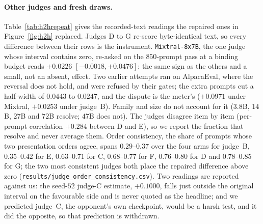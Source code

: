 \paragraph{Other judges and fresh draws.}\label{app:h2hrepeat}
Table~\ref{tab:h2hrepeat} gives the recorded-text readings the repaired ones in Figure~\ref{fig:h2h}
replaced. Judges D to G re-score byte-identical text, so every difference between their rows is the
instrument. \texttt{Mixtral-8x7B}, the one judge whose interval contains zero, re-asked on the $850$-prompt
pass at a binding budget reads $+0.0226$ $[-0.0018, +0.0476]$: the same sign as the others and a small, not an absent, effect. Two earlier attempts ran on AlpacaEval, where the reversal does not hold, and were refused by their gates; the extra prompts cut a half-width of $0.0443$ to $0.0247$, and the dispute is the meter's ($+0.0971$ under Mixtral, $+0.0253$ under judge~B). Family and size do not account for it ($3.8$B, $14$B, $27$B and $72$B resolve;
$47$B does not). The judges disagree item by item (per-prompt correlation $+0.284$ between D and E), so we
report the fraction that resolve and never average them. Order consistency, the share of prompts whose
two presentation orders agree, spans $0.29$--$0.37$ over the four arms for judge~B, $0.35$--$0.42$ for E,
$0.63$--$0.71$ for C, $0.68$--$0.77$ for F, $0.76$--$0.80$ for D and $0.78$--$0.85$ for G; the two most
consistent judges both place the repaired difference above zero
(\texttt{results/\allowbreak judge\_\allowbreak order\_\allowbreak consistency.csv}). Two readings are reported against us: the
seed-$52$ judge-C estimate, $+0.1000$, falls just outside the original interval on the favourable side and
is never quoted as the headline; and we predicted judge~C, the opponent's own checkpoint, would be a harsh
test, and it did the opposite, so that prediction is withdrawn.

